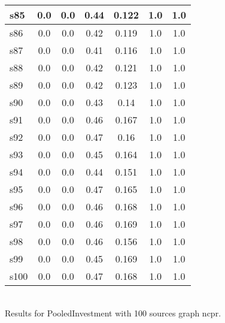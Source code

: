 \documentclass{article}
\begin{document}
\begin{tabular}{|l|c|c|c|c|c|c|}
\hline
s85 &0.0 & 0.0 & 0.44 & 0.122 & 1.0 & 1.0\\
\hline
s86 &0.0 & 0.0 & 0.42 & 0.119 & 1.0 & 1.0\\
\hline
s87 &0.0 & 0.0 & 0.41 & 0.116 & 1.0 & 1.0\\
\hline
s88 &0.0 & 0.0 & 0.42 & 0.121 & 1.0 & 1.0\\
\hline
s89 &0.0 & 0.0 & 0.42 & 0.123 & 1.0 & 1.0\\
\hline
s90 &0.0 & 0.0 & 0.43 & 0.14 & 1.0 & 1.0\\
\hline
s91 &0.0 & 0.0 & 0.46 & 0.167 & 1.0 & 1.0\\
\hline
s92 &0.0 & 0.0 & 0.47 & 0.16 & 1.0 & 1.0\\
\hline
s93 &0.0 & 0.0 & 0.45 & 0.164 & 1.0 & 1.0\\
\hline
s94 &0.0 & 0.0 & 0.44 & 0.151 & 1.0 & 1.0\\
\hline
s95 &0.0 & 0.0 & 0.47 & 0.165 & 1.0 & 1.0\\
\hline
s96 &0.0 & 0.0 & 0.46 & 0.168 & 1.0 & 1.0\\
\hline
s97 &0.0 & 0.0 & 0.46 & 0.169 & 1.0 & 1.0\\
\hline
s98 &0.0 & 0.0 & 0.46 & 0.156 & 1.0 & 1.0\\
\hline
s99 &0.0 & 0.0 & 0.45 & 0.169 & 1.0 & 1.0\\
\hline
s100 &0.0 & 0.0 & 0.47 & 0.168 & 1.0 & 1.0\\
\hline
\end{tabular}\\

\noindent Results for PooledInvestment with 100 sources graph ncpr.
\end{document}
